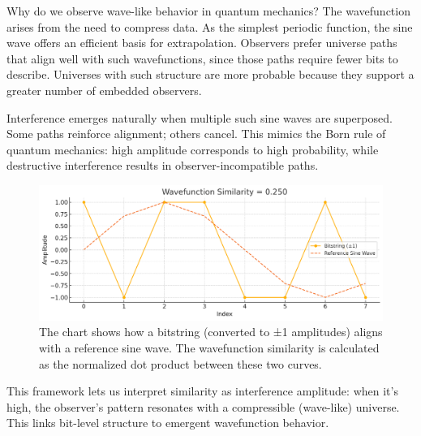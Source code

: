 \documentclass[12pt]{article}
\begin{document}
Why do we observe wave-like behavior in quantum mechanics? The wavefunction arises from the need to compress data. As the simplest periodic function, the sine wave offers an efficient basis for extrapolation. Observers prefer universe paths that align well with such wavefunctions, since those paths require fewer bits to describe. Universes with such structure are more probable because they support a greater number of embedded observers.

Interference emerges naturally when multiple such sine waves are superposed. Some paths reinforce alignment; others cancel. This mimics the Born rule of quantum mechanics: high amplitude corresponds to high probability, while destructive interference results in observer-incompatible paths.

\begin{figure}[h!]
    \centering
    \includegraphics[width=1.0\textwidth]{figures/wavefunction_similarity.png}
    \caption{The chart shows how a bitstring (converted to ±1 amplitudes) aligns with a reference sine wave.
        The wavefunction similarity is calculated as the normalized dot product between these two curves.}
    \label{fig:wavefunction_similarity}
\end{figure}


This framework lets us interpret similarity as interference amplitude: when it's high, the observer's pattern resonates with a compressible (wave-like) universe. This links bit-level structure to emergent wavefunction behavior.
\end{document}
